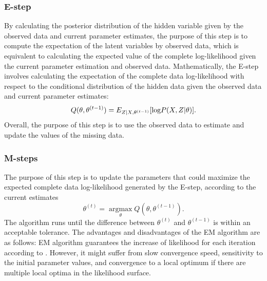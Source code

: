 \subsubsection{E-step}
By calculating the posterior distribution of the hidden variable given by the observed data and current parameter estimates, the purpose of this step is to compute the expectation of the latent variables by observed data, which is equivalent to calculating the expected value of the complete log-likelihood given the current parameter estimation and observed data.
Mathematically, the E-step involves calculating the expectation of the complete data log-likelihood with respect to the conditional distribution of the hidden data given the observed data and current parameter estimates:
\begin{equation}
	Q(\theta,\theta^{(t-1)}) = E_{Z|X,\theta^{(t-1)}}[\textnormal{log}P(X,Z|\theta)].
\end{equation}
Overall, the purpose of this step is to use the observed data to estimate and update the values of the missing data.

\subsubsection{M-steps}
The purpose of this step is to update the parameters that could maximize the expected complete data log-likelihood generated by the E-step, according to the current estimates
\begin{equation}
	\theta^{(t)} = 
	\operatorname*{argmax}_{\theta} Q(\theta,\theta^{(t-1)}).
\end{equation}
The algorithm runs until the difference between $\theta^{(t)}$ and $\theta^{(t-1)}$ is within an acceptable tolerance. 
The advantages and disadvantages of the EM algorithm are as follows: EM algorithm guarantees the increase of likelihood for each iteration according to \cite{EM}. However, it might suffer from slow convergence speed, sensitivity to the initial parameter values, and convergence to a local optimum if there are multiple local optima in the likelihood surface.
